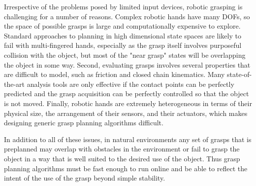 Irrespective of the problems posed by limited input devices, robotic grasping is challenging for a number of reasons. Complex robotic hands have many DOFs, so the space of possible grasps is large and computationally expensive to explore. Standard approaches to planning in high dimensional state spaces are likely to fail with multi-fingered hands, especially as the grasp itself involves purposeful collision with the object, but most of the "near grasp" states will be overlapping the object in some way. Second, evaluating grasps involves several properties that are difficult to model, such as friction and closed chain kinematics. Many state-of-the-art analysis tools are only effective if the contact points can be perfectly predicted and the grasp acquisition can be perfectly controlled so that the object is not moved. Finally, robotic hands are extremely heterogeneous in terms of their physical size, the arrangement of their sensors, and their actuators, which makes designing generic grasp planning algorithms difficult.

In addition to all of these issues, in natural environments any set of grasps that is preplanned may overlap with obstacles in the environment or fail to grasp the object in a way that is well suited to the desired use of the object. Thus grasp planning algorithms must be fast enough to run online and be able to reflect the intent of the use of the grasp beyond simple stability.

